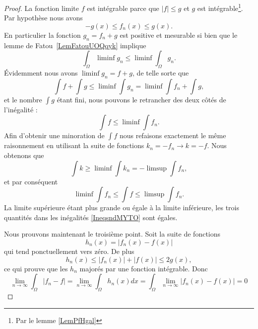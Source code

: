 \begin{proof}

    La fonction limite \( f\) est intégrable parce que \( | f |\leq g\) et \( g\) est intégrable\footnote{Par le lemme \ref{LemPfHgal}}. Par hypothèse nous avons
    \begin{equation}
        -g(x)\leq f_n(x)\leq g(x).
    \end{equation}
    En particulier la fonction \( g_n=f_n+g\) est positive et mesurable si bien que le lemme de Fatou~\ref{LemFatouUOQqyk} implique
    \begin{equation}
        \int_{\Omega}\liminf g_n\leq\liminf\int_{\Omega}g_n.
    \end{equation}
    Évidemment nous avons \( \liminf g_n=f+g\), de telle sorte que
    \begin{equation}
        \int f+\int g\leq \liminf\int g_n=\liminf\int f_n+\int g,
    \end{equation}
    et le nombre \( \int g\) étant fini, nous pouvons le retrancher des deux côtés de l'inégalité :
    \begin{equation}
        \int f\leq\liminf\int f_n.
    \end{equation}
    Afin d'obtenir une minoration de \( \int f\) nous refaisons exactement le même raisonnement en utilisant la suite de fonctions \( k_n=-f_n\to k=-f\). Nous obtenons que
    \begin{equation}
        \int k\geq\liminf\int k_n=-\limsup\int f_n,
    \end{equation}
    et par conséquent
    \begin{equation}    \label{IneqsndMYTO}
        \liminf\int f_n\leq\int f\leq\limsup\int f_n.
    \end{equation}
    La limite supérieure étant plus grande ou égale à la limite inférieure, les trois quantités dans les inégalités \eqref{IneqsndMYTO} sont égales.

    Nous prouvons maintenant le troisième point. Soit la suite de fonctions
    \begin{equation}
        h_n(x)=| f_n(x)-f(x) |
    \end{equation}
    qui tend ponctuellement vers zéro. De plus
    \begin{equation}
    h_n(x)\leq | f_n(x) |+| f(x) |\leq 2g(x),
    \end{equation}
    ce qui prouve que les \( h_n\) majorés par une fonction intégrable. Donc
    \begin{equation}
        \lim_{n\to \infty} \int_{\Omega}| f_n-f |= \lim_{n\to \infty} \int_{\Omega}h_n(x)dx=\int_{\Omega}\lim_{n\to \infty} | f_n(x)-f(x) |=0
    \end{equation}
\end{proof}


